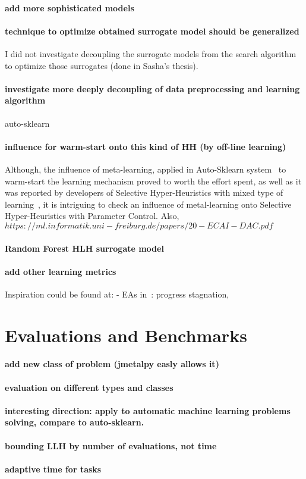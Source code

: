 \paragraph{add more sophisticated models}
\paragraph{technique to optimize obtained surrogate model should be generalized}
I did not investigate decoupling the surrogate models from the search algorithm to optimize those surrogates (done in Sasha's thesis).
\paragraph{investigate more deeply decoupling of data preprocessing and learning algorithm} auto-sklearn
\paragraph{influence for warm-start onto this kind of HH (by off-line learning)}
Although, the influence of meta-learning, applied in Auto-Sklearn system~\cite{feurer2015efficient} to warm-start the learning mechanism proved to worth the effort spent, as well as it was reported by developers of Selective Hyper-Heuristics with mixed type of learning~\cite{uludaug2013hybrid,}, it is intriguing to check an influence of metal-learning onto Selective Hyper-Heuristics with Parameter Control.
Also, $https://ml.informatik.uni-freiburg.de/papers/20-ECAI-DAC.pdf$
\paragraph{Random Forest HLH surrogate model}
\paragraph{add other learning metrics}
Inspiration could be found at:
- EAs in~\cite{karafotias2014generic}: progress stagnation, 


\section{Evaluations and Benchmarks}\label{fw: evaluation}
\paragraph{add new class of problem (jmetalpy easly allows it)}
\paragraph{evaluation on different types and classes}
\paragraph{interesting direction: apply to automatic machine learning problems solving, compare to auto-sklearn.}
\paragraph{bounding LLH by number of evaluations, not time}
\paragraph{adaptive time for tasks}

